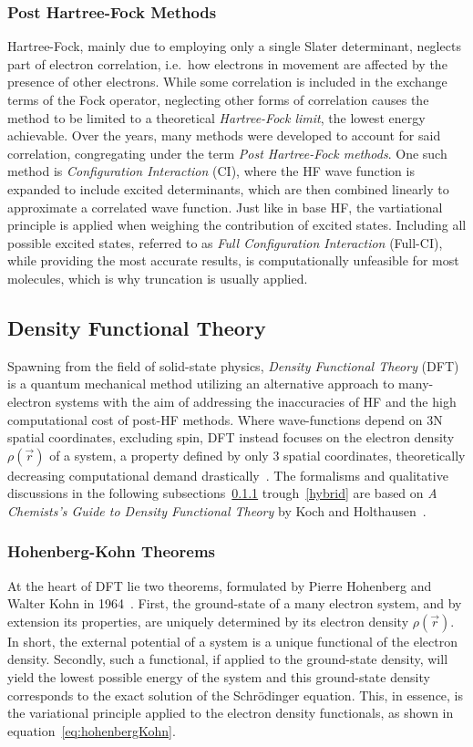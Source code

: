\documentclass[12pt]{article}
\begin{document}
\subsubsection{Post Hartree-Fock Methods}
Hartree-Fock, mainly due to employing only a single Slater determinant, neglects part of electron correlation, i.e.~how electrons in movement are affected by the presence of other electrons.
While some correlation is included in the exchange terms of the Fock operator, neglecting other forms of correlation causes the method to be limited to a theoretical \textit{Hartree-Fock limit}, the lowest energy achievable.
Over the years, many methods were developed to account for said correlation, congregating under the term \textit{Post Hartree-Fock methods}.
One such method is \textit{Configuration Interaction} (CI), where the HF wave function is expanded to include excited determinants, which are then combined linearly to approximate a correlated wave function. Just like in base HF, the vartiational principle is applied when weighing the contribution of excited states.
Including all possible excited states, referred to as \textit{Full Configuration Interaction} (Full-CI), while providing the most accurate results, is computationally unfeasible for most molecules, which is why truncation is usually applied.

\subsection{Density Functional Theory}
Spawning from the field of solid-state physics, \textit{Density Functional Theory} (DFT) is a quantum mechanical method utilizing an alternative approach to many-electron systems with the aim of addressing the inaccuracies of HF and the high computational cost of post-HF methods.
Where wave-functions depend on 3N spatial coordinates, excluding spin, DFT instead focuses on the electron density $\rho(\vec{r})$ of a system, a property defined by only 3 spatial coordinates, theoretically decreasing computational demand drastically~\cite{Orio2009}.
The formalisms and qualitative discussions in the following subsections~\ref{hohenbergKohn} trough~\ref{hybrid} are based on \textit{A Chemists's Guide to Density Functional Theory} by Koch and Holthausen~\cite{Koch2001-yq}.

\subsubsection{Hohenberg-Kohn Theorems}\label{hohenbergKohn}
At the heart of DFT lie two theorems, formulated by Pierre Hohenberg and Walter Kohn in 1964~\cite{Hohenberg1964}.
First, the ground-state of a many electron system, and by extension its properties, are uniquely determined by its electron density $\rho(\vec{r})$. In short, the external potential of a system is a unique functional of the electron density.
Secondly, such a functional, if applied to the ground-state density, will yield the lowest possible energy of the system and this ground-state density corresponds to the exact solution of the Schrödinger equation. 
This, in essence, is the variational principle applied to the electron density functionals, as shown in equation~\ref{eq:hohenbergKohn}.
\end{document}
